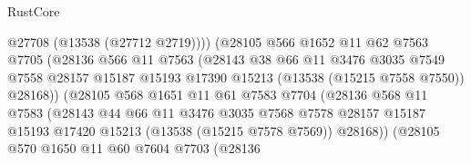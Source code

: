 \begin{lexlean}{RustCore}
\begin{coremodule}
                                  @27708
                                  (@13538 (@27712 @2719))))
                              (@28105
                                @566
                                @1652
                                @11
                                @62
                                @7563
                                @7705
                                (@28136
                                  @566
                                  @11
                                  @7563
                                  (@28143
                                    @38
                                    @66
                                    @11
                                    @3476
                                    @3035
                                    @7549
                                    @7558
                                    @28157
                                    @15187
                                    @15193
                                    @17390
                                    @15213
                                    (@13538 (@15215 @7558 @7550))
                                    @28168))
                                (@28105
                                  @568
                                  @1651
                                  @11
                                  @61
                                  @7583
                                  @7704
                                  (@28136
                                    @568
                                    @11
                                    @7583
                                    (@28143
                                      @44
                                      @66
                                      @11
                                      @3476
                                      @3035
                                      @7568
                                      @7578
                                      @28157
                                      @15187
                                      @15193
                                      @17420
                                      @15213
                                      (@13538 (@15215 @7578 @7569))
                                      @28168))
                                  (@28105
                                    @570
                                    @1650
                                    @11
                                    @60
                                    @7604
                                    @7703
                                    (@28136

\end{coremodule}
\end{lexlean}
